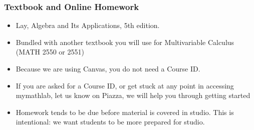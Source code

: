 \documentclass[xcolor=table,11pt,notes=hide,t,handout]{beamer}
\begin{document}










\begin{frame}\frametitle{Textbook and Online Homework}

    \begin{itemize}
        \item Lay, Algebra and Its Applications, 5th edition. 
        \item Bundled with another textbook you will use for Multivariable Calculus (MATH 2550 or 2551)
        \item Because we are using Canvas, you do not need a Course ID. 
        \item If you are asked for a Course ID, or get stuck at any point in accessing mymathlab, let us know on Piazza, we will help you through getting started 
        \item Homework tends to be due before material is covered in studio. This is intentional: we want students to be more prepared for studio. 
    \end{itemize}

\end{frame}
\end{document}
